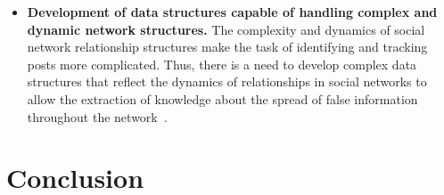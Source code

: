 \documentclass{ieeeaccess}
\begin{document}
\begin{itemize}

    \item {\bf Development of data structures capable of handling complex and dynamic network structures.} The complexity and dynamics of social network relationship structures make the task of identifying and tracking posts more complicated. Thus, there is a need to develop complex data structures that reflect the dynamics of relationships in social networks to allow the extraction of knowledge about the spread of false information throughout the network~\cite{meel2020}.


\end{itemize}


\section{Conclusion}
\label{sec:conclusion}
\end{document}

